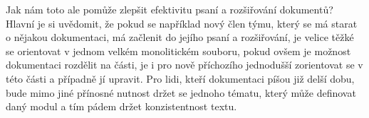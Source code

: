 Jak nám toto ale pomůže zlepšit efektivitu psaní a rozšiřování dokumentů? Hlavní je si uvědomit, že pokud se například nový člen týmu, který se má starat o nějakou
dokumentaci, má začlenit do jejího psaní a rozšiřování, je velice těžké se orientovat v jednom velkém monolitickém souboru, pokud ovšem je možnost dokumentaci rozdělit
na části, je i pro nově příchozího jednodušší zorientovat se v této části a případně jí upravit. Pro lidi, kteří dokumentaci píšou již delší dobu, bude mimo jiné přínosné
nutnost držet se jednoho tématu, který může definovat daný modul a tím pádem držet konzistentnost textu. \cite{modularDocuments}
